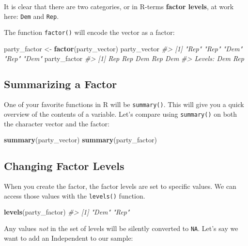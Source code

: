 \documentclass[]{book}
\newenvironment{Shaded}{\begin{snugshade}}{\end{snugshade}}
\newcommand{\KeywordTok}[1]{\textcolor[rgb]{0.13,0.29,0.53}{\textbf{#1}}}
\newcommand{\StringTok}[1]{\textcolor[rgb]{0.31,0.60,0.02}{#1}}
\newcommand{\CommentTok}[1]{\textcolor[rgb]{0.56,0.35,0.01}{\textit{#1}}}
\newcommand{\NormalTok}[1]{#1}
\begin{document}
It is clear that there are two categories, or in R-terms \textbf{factor
levels}, at work here: \texttt{Dem} and \texttt{Rep}.

The function \texttt{factor()} will encode the vector as a factor:

\begin{Shaded}
\begin{Highlighting}[]
\NormalTok{party_factor <-}\StringTok{ }\KeywordTok{factor}\NormalTok{(party_vector)}
\NormalTok{party_vector}
\CommentTok{#> [1] "Rep" "Rep" "Dem" "Rep" "Dem"}
\NormalTok{party_factor}
\CommentTok{#> [1] Rep Rep Dem Rep Dem}
\CommentTok{#> Levels: Dem Rep}
\end{Highlighting}
\end{Shaded}

\subsection{Summarizing a Factor}\label{summarizing-a-factor}

One of your favorite functions in R will be \texttt{summary()}. This
will give you a quick overview of the contents of a variable. Let's
compare using \texttt{summary()} on both the character vector and the
factor:

\begin{Shaded}
\begin{Highlighting}[]
\KeywordTok{summary}\NormalTok{(party_vector)}
\KeywordTok{summary}\NormalTok{(party_factor)}
\end{Highlighting}
\end{Shaded}

\subsection{Changing Factor Levels}\label{changing-factor-levels}

When you create the factor, the factor levels are set to specific
values. We can access those values with the \texttt{levels()} function.

\begin{Shaded}
\begin{Highlighting}[]
\KeywordTok{levels}\NormalTok{(party_factor)}
\CommentTok{#> [1] "Dem" "Rep"}
\end{Highlighting}
\end{Shaded}

Any values \emph{not} in the set of levels will be silently converted to
\texttt{NA}. Let's say we want to add an Independent to our sample:
\end{document}
